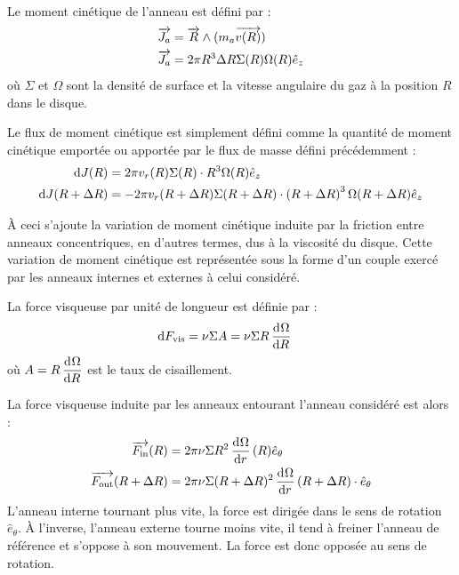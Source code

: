 Le moment cinétique de l'anneau est défini par :
\begin{align}
\vect{J_a} &= \vect{R} \wedge (m_a\vect{v(R)}) \nonumber\\
\vect{J_a} &= 2\pi R^3 \Delta R \Sigma(R)\Omega(R)\hat{e}_z\label{eq:J_a}
\end{align}
où $\Sigma$ et $\Omega$ sont la densité de surface et la vitesse angulaire du gaz à la position $R$ dans le disque.

Le flux de moment cinétique est simplement défini comme la quantité de moment cinétique emportée ou apportée par le flux de masse défini précédemment  :
\begin{subequations}
\begin{align}
\operatorname{d \!} J(R) &= 2\pi v_r(R) \Sigma(R)\cdot R^3\Omega(R)\hat{e}_z\label{eq:dJ_in}\\
\operatorname{d \!} J(R+\Delta R) &= -2\pi v_r(R+\Delta R) \Sigma(R+\Delta R)\cdot \left(R+\Delta R\right)^3\Omega(R+\Delta R)\hat{e}_z\label{eq:dJ_out}
\end{align}\label{eq:dJ}
\end{subequations}

\bigskip

À ceci s'ajoute la variation de moment cinétique induite par la friction entre anneaux concentriques, en d'autres termes, dus à la viscosité du disque. Cette variation de moment cinétique est représentée sous la forme d'un couple exercé par les anneaux internes et externes à celui considéré. 

La force visqueuse par unité de longueur est définie par :
\begin{align}
\operatorname{d \!} F_\text{vis} &= \nu \Sigma A = \nu \Sigma R \mathinner{ \dfrac{\operatorname{d \!}{^{}}\Omega}{\operatorname{d \!}{{R}^{}}} }
\end{align}
où $A=R \mathinner{ \dfrac{\operatorname{d \!}{^{}}\Omega}{\operatorname{d \!}{{R}^{}}} }$ est le taux de cisaillement.

La force visqueuse induite par les anneaux entourant l'anneau considéré est alors : 
\begin{subequations}
\begin{align}
{\overrightarrow{F_\text{in}}}(R)&= 2\pi\nu \Sigma R^2 \mathinner{ \dfrac{\operatorname{d \!}{^{}}\Omega}{\operatorname{d \!}{{r}^{}}} }(R) \hat{e}_\theta\\
{\overrightarrow{F_\text{out}}}(R+\Delta R)&= 2\pi\nu \Sigma (R+\Delta R)^2 \mathinner{ \dfrac{\operatorname{d \!}{^{}}\Omega}{\operatorname{d \!}{{r}^{}}} }(R+\Delta R) \cdot \hat{e}_\theta
\end{align}
\end{subequations}
L'anneau interne tournant plus vite, la force est dirigée dans le sens de rotation $\hat{e}_\theta$. À l'inverse, l'anneau externe tourne moins vite, il tend à freiner l'anneau de référence et s'oppose à son mouvement. La force est donc opposée au sens de rotation.

